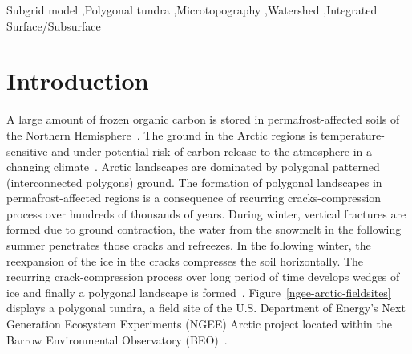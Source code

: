 \documentclass[review,11pt]{elsarticle}
\begin{document}
\begin{frontmatter}
\begin{keyword}
Subgrid model \sep Polygonal tundra \sep  Microtopography  \sep Watershed \sep Integrated Surface/Subsurface
\end{keyword}


\end{frontmatter}

\linenumbers

\FloatBarrier
\section{Introduction}\label{introduction}

 A large amount of frozen organic carbon is stored in permafrost-affected soils of the Northern Hemisphere~\cite{schuur2015climate,bg-11-6573-2014}. The ground in the Arctic regions is temperature-sensitive and under potential risk of carbon release to the atmosphere in a changing climate~\cite{hinzman2005evidence}.
Arctic landscapes are dominated by polygonal patterned (interconnected polygons) ground. The formation of polygonal landscapes in permafrost-affected regions is a consequence of recurring cracks-compression process over hundreds of thousands of years. During winter, vertical fractures are formed due to ground contraction, the water from the snowmelt in the following summer penetrates those cracks and refreezes. In the following winter, the reexpansion of the ice in the cracks compresses the soil horizontally. The recurring crack-compression process over long period of time develops wedges of ice and finally a polygonal landscape is formed~\cite{lachenbruch1962mechanics,greene1963contraction,mackay1990some,mackay2004thermally}. Figure~\ref{ngee-arctic-fieldsites} displays a polygonal tundra, a field site of the U.S. Department of Energy's Next Generation Ecosystem Experiments (NGEE) Arctic project located within the Barrow Environmental Observatory (BEO)~\cite{kumar2016modeling}.
\end{document}
